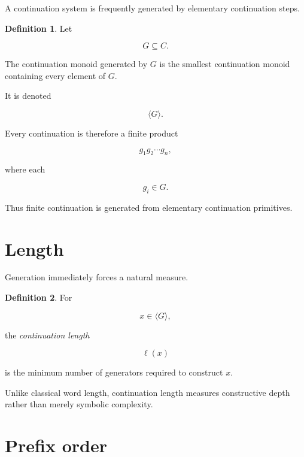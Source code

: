 \documentclass[13pt,openany]{book}
\theoremstyle{plain}
\theoremstyle{definition}
\newtheorem{definition}{Definition}[chapter]
\begin{document}
A continuation system is frequently generated by elementary continuation steps.

\begin{definition}

Let

\[
G\subseteq C.
\]

The continuation monoid generated by $G$ is the smallest continuation monoid
containing every element of $G$.

It is denoted

\[
\langle G\rangle.
\]

\end{definition}

Every continuation is therefore a finite product

\[
g_1g_2\cdots g_n,
\]

where each

\[
g_i\in G.
\]

Thus finite continuation is generated from elementary continuation primitives.

\section{Length}

Generation immediately forces a natural measure.

\begin{definition}

For

\[
x\in\langle G\rangle,
\]

the \emph{continuation length}

\[
\ell(x)
\]

is the minimum number of generators required to construct $x$.

\end{definition}

Unlike classical word length, continuation length measures constructive depth
rather than merely symbolic complexity.

\section{Prefix order}
\end{document}
